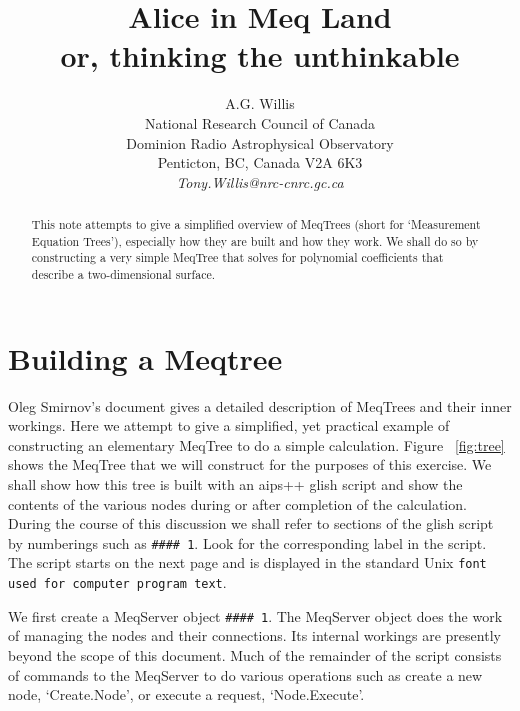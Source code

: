 \documentclass[10pt]{article}
\begin{document}
\title{Alice in Meq Land \\
or, thinking the unthinkable} 

\author{A.G. Willis\\ National Research Council of Canada\\ Dominion Radio Astrophysical Observatory\\
Penticton, BC, Canada V2A 6K3\\
\emph{Tony.Willis@nrc-cnrc.gc.ca}}          

\maketitle

\begin{abstract}
This note attempts to give a simplified overview of MeqTrees (short
for `Measurement Equation Trees'), especially how they are built
and how they work. We shall do so by constructing a very simple
MeqTree that solves for polynomial coefficients that describe a 
two-dimensional surface. 
\end{abstract}

\section{Building a Meqtree}
Oleg Smirnov's \cite{smirnov} document gives a detailed description
of MeqTrees and their inner workings. Here we attempt to give a simplified,
yet practical example of constructing an elementary MeqTree to do a simple 
calculation. Figure ~\ref{fig:tree} shows the MeqTree that we will
construct for the purposes of this exercise. We shall show how this
tree is built with an aips++ glish script and show the contents of the
various nodes during or after completion of the calculation. During
the course of this discussion we shall refer to sections of the
glish script by numberings such as {\tt \#\#\#\# 1}. Look for the
corresponding label in the script. The script starts on the next page
and is displayed in the standard Unix {\tt font used for computer
program text}.

We first create a MeqServer object {\tt \#\#\#\# 1}. The MeqServer
object does the work of managing the nodes and their connections.
Its internal workings are presently beyond the scope of this document.
Much of the remainder of the script consists of commands to the
MeqServer to do various operations such as create a new node, `Create.Node',
or execute a request, `Node.Execute'.
\end{document}
